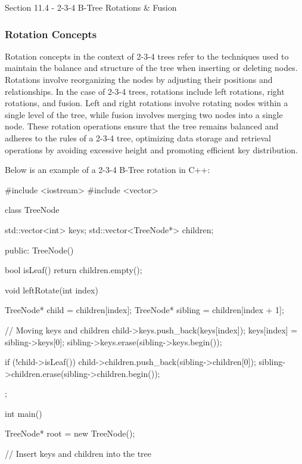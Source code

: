 \begin{notes}{Section 11.4 - 2-3-4 B-Tree Rotations \& Fusion}
    \subsubsection*{Rotation Concepts}

    Rotation concepts in the context of 2-3-4 trees refer to the techniques used to maintain the balance and structure of the tree when inserting or deleting nodes. Rotations involve reorganizing the nodes by adjusting their positions and relationships. In the case of 2-3-4 trees, rotations include left rotations, right rotations, 
    and fusion. Left and right rotations involve rotating nodes within a single level of the tree, while fusion involves merging two nodes into a single node. These rotation operations ensure that the tree remains balanced and adheres to the rules of a 2-3-4 tree, optimizing data storage and retrieval operations by avoiding excessive 
    height and promoting efficient key distribution.
    
    \begin{highlight}
        Below is an example of a 2-3-4 B-Tree rotation in C++:
    
    \begin{code}[C++]
    #include <iostream>
    #include <vector>
    
    class TreeNode {
        std::vector<int> keys;
        std::vector<TreeNode*> children;
    
    public:
        TreeNode() {}
    
        bool isLeaf() {
            return children.empty();
        }
    
        void leftRotate(int index) {
            TreeNode* child = children[index];
            TreeNode* sibling = children[index + 1];
    
            // Moving keys and children
            child->keys.push_back(keys[index]);
            keys[index] = sibling->keys[0];
            sibling->keys.erase(sibling->keys.begin());
    
            if (!child->isLeaf()) {
                child->children.push_back(sibling->children[0]);
                sibling->children.erase(sibling->children.begin());
            }
        }
    };
    
    int main() {
        TreeNode* root = new TreeNode();
    
        // Insert keys and children into the tree
    
}
\end{code}
\end{highlight}
\end{notes}
